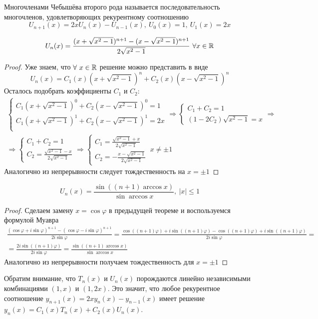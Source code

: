 \begin{definition}
  Многочленами Чебышёва второго рода называется последовательность
  многочленов, удовлетворяющих рекурентному соотношению
  \[U_{n+1}(x)=2xU_n(x)-U_{n-1}(x),\ U_0(x)=1,\ U_1(x)=2x\]
\end{definition}
\begin{theorem}
  \[U_n(x)=\frac{(x+\sqrt{x^2-1})^{n+1}-(x-\sqrt{x^2-1})^{n+1}}{2\sqrt{x^2-1}}\ \forall x\in\R\]
\end{theorem}
\begin{proof}
  Уже знаем, что $\forall\ x\in\R$ решение можно представить в виде
  \[U_n(x)=C_1(x)(x+\sqrt{x^2-1})^n+C_2(x)(x-\sqrt{x^2-1})^n\]
  Осталось подобрать коэффициенты $C_1$ и $C_2$:
  \begin{multline*}
    \begin{cases}
      C_1(x+\sqrt{x^2-1})^0+C_2(x-\sqrt{x^2-1})^0=1  \\
      C_1(x+\sqrt{x^2-1})^1+C_2(x-\sqrt{x^2-1})^1=2x \\
    \end{cases}\Rightarrow\begin{cases}
      C_1+C_2=1 \\
      (1-2C_2)\sqrt{x^2-1}=x
    \end{cases}\Rightarrow \\ \Rightarrow\begin{cases}
      C_1+C_2=1 \\
      C_2=\frac{\sqrt{x^2-1} - x}{2\sqrt{x^2-1}}
    \end{cases}\Rightarrow \begin{cases}
      C_1=\frac{\sqrt{x^2-1} + x}{2\sqrt{x^2-1}} \\
      C_2=-\frac{x-\sqrt{x^2-1}}{2\sqrt{x^2-1}}
    \end{cases}\ x\neq\pm1
  \end{multline*}
  Аналогично из непрерывности следует тождественность на $x=\pm1$
\end{proof}

\begin{theorem}
  \[U_n(x)=\frac{\sin((n+1)\arccos{x})}{\sin\arccos{x}},\ |x|\leq1\]
\end{theorem}
\begin{proof}
  Сделаем замену $x=\cos\varphi$ в предыдущей теореме и воспользуемся формулой Муавра
  \begin{multline*}
    \frac{(\cos\varphi+i\sin\varphi)^{n+1}-(\cos\varphi-i\sin\varphi)^{n+1}}{2i\sin\varphi}=\frac{\cos((n+1)\varphi)+i\sin((n+1)\varphi)-\cos((n+1)\varphi)+i\sin((n+1)\varphi)}{2i\sin\varphi} = \\
    = \frac{2i\sin((n+1)\varphi)}{2i\sin\varphi}=\frac{\sin((n+1)\arccos{x})}{\sin\arccos{x}}
  \end{multline*}
  Аналогично из непрерывности получаем тождественность для $x=\pm1$
\end{proof}
\begin{remark*}
  Обратим внимание, что $T_n(x)$ и $U_n(x)$ порождаются линейно независимыми
  комбинациями $(1,x)$ и $(1,2x)$. Это значит, что любое рекурентное
  соотношение $y_{n+1}(x)=2xy_n(x)-y_{n-1}(x)$ имеет решение
  $y_{n}(x)=C_1(x)T_n(x)+C_2(x)U_n(x)$.
\end{remark*}
